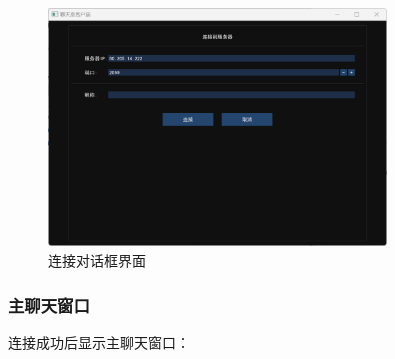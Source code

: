 \documentclass[12pt, a4paper]{article}
\begin{document}
\begin{figure}[H]
   \centering
   \includegraphics[width=0.8\textwidth]{pic/connect_dialog.png}
   \caption{连接对话框界面}
   \label{fig:connect_dialog}
\end{figure}

\subsubsection{主聊天窗口}

连接成功后显示主聊天窗口：
\end{document}

